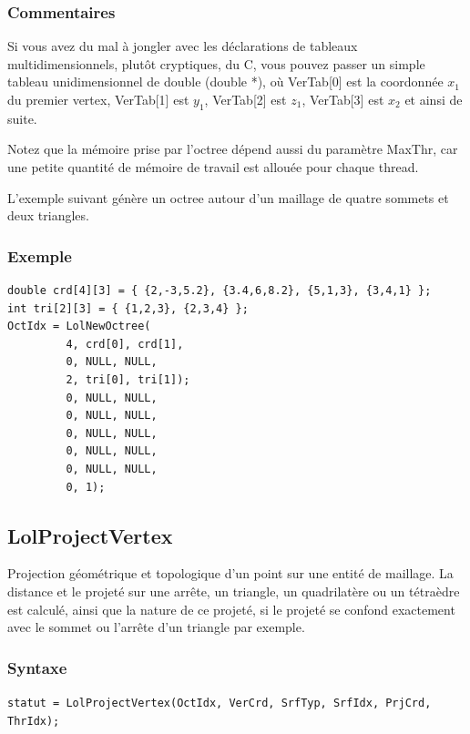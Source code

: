 \documentclass[a4paper,12pt]{article}
\begin{document}
\subsubsection*{Commentaires}
Si vous avez du mal à jongler avec les déclarations de tableaux multidimensionnels, plutôt cryptiques, du C, vous pouvez passer un simple tableau unidimensionnel de double (double *), où VerTab[0] est la coordonnée $x_1$ du premier vertex, VerTab[1] est $y_1$, VerTab[2] est $z_1$, VerTab[3] est $x_2$ et ainsi de suite.

Notez que la mémoire prise par l'octree dépend aussi du paramètre MaxThr, car une petite quantité de mémoire de travail est allouée pour chaque thread.

L'exemple suivant génère un octree autour d'un maillage de quatre sommets et deux triangles.

\subsubsection*{Exemple}

\begin{tt}
\begin{verbatim}
double crd[4][3] = { {2,-3,5.2}, {3.4,6,8.2}, {5,1,3}, {3,4,1} };
int tri[2][3] = { {1,2,3}, {2,3,4} };
OctIdx = LolNewOctree(
         4, crd[0], crd[1],
         0, NULL, NULL,
         2, tri[0], tri[1]);
         0, NULL, NULL,
         0, NULL, NULL,
         0, NULL, NULL,
         0, NULL, NULL,
         0, NULL, NULL,
         0, 1);
\end{verbatim}
\end{tt}
\normalfont


\subsection{LolProjectVertex}
Projection géométrique et topologique d'un point sur une entité de maillage. La distance et le projeté sur une arrête, un triangle, un quadrilatère ou un tétraèdre est calculé, ainsi que la nature de ce projeté, si le projeté se confond exactement avec le sommet ou l'arrête d'un triangle par exemple.

\subsubsection*{Syntaxe}
{\tt statut = LolProjectVertex(OctIdx, VerCrd, SrfTyp, SrfIdx, PrjCrd, ThrIdx);}
\end{document}
